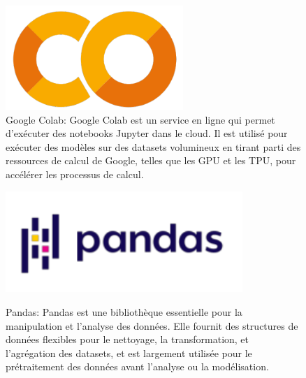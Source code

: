\begin{figure}[h!]
	\centering
	\begin{minipage}[t]{0.46\textwidth}
		\centering
		\includegraphics[width=0.6\textwidth]{images/logoColabs} \\ %
		\caption[Logo Google Colab]{Google Colab: Google Colab est un service en ligne qui permet d'exécuter des notebooks Jupyter dans le cloud. Il est utilisé pour exécuter des modèles sur des datasets volumineux en tirant parti des ressources de calcul de Google, telles que les GPU et les TPU, pour accélérer les processus de calcul.}
		\label{fig:colab}
	\end{minipage}
	\hfill
	\begin{minipage}[t]{0.46\textwidth}
		\centering
		\includegraphics[width=0.8\textwidth]{images/logoPandas} \\ %
		\caption[Logo Pandas]{Pandas: Pandas est une bibliothèque essentielle pour la manipulation et l'analyse des données. Elle fournit des structures de données flexibles pour le nettoyage, la transformation, et l'agrégation des datasets, et est largement utilisée pour le prétraitement des données avant l'analyse ou la modélisation.}
		\label{fig:pandas}
	\end{minipage}
\end{figure}

\vspace{1em}

